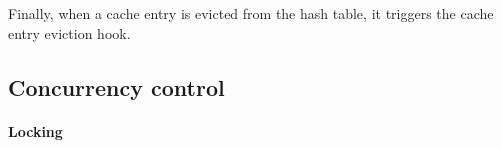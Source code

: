 Finally, when a cache entry is evicted from the hash table, it triggers the 
cache entry eviction hook.

\begin{comment}
\begin{itemize}
	\item Insert a new entry to the LRU list
	\item Evict the LRU entry
	\item Update an entry's access time (i.e. mark it as MRU)
	\item Remove an arbitrary entry
\end{itemize}

Lets explain these fields a bit:

\begin{description}
	\item[lru:] Obviously, it's the least recently used entry. It can be 
		considered as the one end of the doubly linked list.
	\item[mru:] The entry that has just been used. It can be considered as 
		the other end of the doubly-linked list
	\item[younger:] This entry-specific field points to an entry used right 
		after our entry was used.
	\item[older:] Same as "younger", it points to the entry that has been 
		used right before our entry was used.
\end{description}

Finally, as we have explained in Section \ref{sec:xcache-evict-design}, the 
eviction internals should normally not bother the user. However, if the user 
wants to, \xcache exposes the following functions:

\begin{description}
	\item[xcache\_evict\_lru:] The name says it all, it evicts the recently 
		used item.
	\item[xcache\_peek\_and\_get\_lru:] This function allows the user to 
		atomically take a peek on the Least Recently Used entry and also 
		update its refcount.
\end{description}
\end{comment}

\subsection{Concurrency control}\label{sec:conc-imp}

\paragraph{Locking}\label{par:lock}

